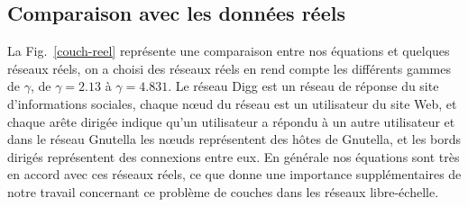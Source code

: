 \subsection{Comparaison avec les données réels}
La Fig.~\ref{couch-reel} représente une comparaison entre nos équations et quelques réseaux réels, on a choisi des réseaux réels en rend compte les différents gammes de $\gamma$, de $\gamma=2.13$ à $\gamma=4.831$.
Le réseau Digg est un réseau de réponse du site d'informations sociales, chaque nœud du réseau est un utilisateur du site Web, et chaque arête dirigée indique qu'un utilisateur a répondu à un autre utilisateur et dans le réseau Gnutella les nœuds représentent des hôtes de Gnutella, et les bords dirigés représentent des connexions entre eux. En générale nos équations sont très en accord avec ces réseaux réels, ce que donne une importance supplémentaires de notre travail concernant ce problème de couches dans les réseaux libre-échelle. 


